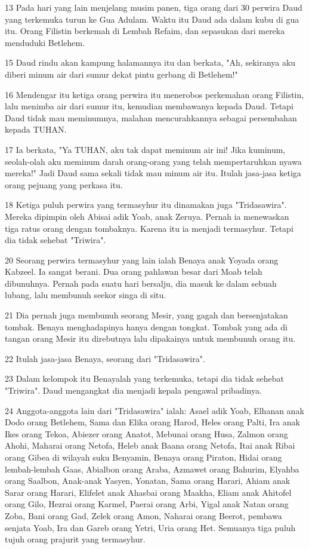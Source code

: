 \par 13 Pada hari yang lain menjelang musim panen, tiga orang dari 30 perwira Daud yang terkemuka turun ke Gua Adulam. Waktu itu Daud ada dalam kubu di gua itu. Orang Filistin berkemah di Lembah Refaim, dan sepasukan dari mereka menduduki Betlehem.
\par 15 Daud rindu akan kampung halamannya itu dan berkata, "Ah, sekiranya aku diberi minum air dari sumur dekat pintu gerbang di Betlehem!"
\par 16 Mendengar itu ketiga orang perwira itu menerobos perkemahan orang Filistin, lalu menimba air dari sumur itu, kemudian membawanya kepada Daud. Tetapi Daud tidak mau meminumnya, malahan mencurahkannya sebagai persembahan kepada TUHAN.
\par 17 Ia berkata, "Ya TUHAN, aku tak dapat meminum air ini! Jika kuminum, seolah-olah aku meminum darah orang-orang yang telah mempertaruhkan nyawa mereka!" Jadi Daud sama sekali tidak mau minum air itu. Itulah jasa-jasa ketiga orang pejuang yang perkasa itu.
\par 18 Ketiga puluh perwira yang termasyhur itu dinamakan juga "Tridasawira". Mereka dipimpin oleh Abisai adik Yoab, anak Zeruya. Pernah ia menewaskan tiga ratus orang dengan tombaknya. Karena itu ia menjadi termasyhur. Tetapi dia tidak sehebat "Triwira".
\par 20 Seorang perwira termasyhur yang lain ialah Benaya anak Yoyada orang Kabzeel. Ia sangat berani. Dua orang pahlawan besar dari Moab telah dibunuhnya. Pernah pada suatu hari bersalju, dia masuk ke dalam sebuah lubang, lalu membunuh seekor singa di situ.
\par 21 Dia pernah juga membunuh seorang Mesir, yang gagah dan bersenjatakan tombak. Benaya menghadapinya hanya dengan tongkat. Tombak yang ada di tangan orang Mesir itu direbutnya lalu dipakainya untuk membunuh orang itu.
\par 22 Itulah jasa-jasa Benaya, seorang dari "Tridasawira".
\par 23 Dalam kelompok itu Benayalah yang terkemuka, tetapi dia tidak sehebat "Triwira". Daud mengangkat dia menjadi kepala pengawal pribadinya.
\par 24 Anggota-anggota lain dari "Tridasawira" ialah: Asael adik Yoab, Elhanan anak Dodo orang Betlehem, Sama dan Elika orang Harod, Heles orang Palti, Ira anak Ikes orang Tekoa, Abiezer orang Anatot, Mebunai orang Husa, Zalmon orang Ahohi, Maharai orang Netofa, Heleb anak Baana orang Netofa, Itai anak Ribai orang Gibea di wilayah suku Benyamin, Benaya orang Piraton, Hidai orang lembah-lembah Gaas, Abialbon orang Araba, Azmawet orang Bahurim, Elyahba orang Saalbon, Anak-anak Yasyen, Yonatan, Sama orang Harari, Ahiam anak Sarar orang Harari, Elifelet anak Ahasbai orang Maakha, Eliam anak Ahitofel orang Gilo, Hezrai orang Karmel, Paerai orang Arbi, Yigal anak Natan orang Zoba, Bani orang Gad, Zelek orang Amon, Naharai orang Beerot, pembawa senjata Yoab, Ira dan Gareb orang Yetri, Uria orang Het. Semuanya tiga puluh tujuh orang prajurit yang termasyhur.

